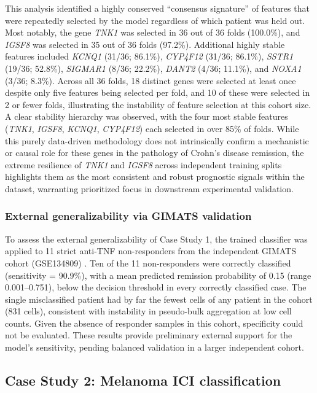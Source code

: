 \documentclass{bmcart}
\begin{document}
This analysis identified a highly conserved ``consensus signature'' of features that were repeatedly selected by the model regardless of which patient was held out. Most notably, the gene \textit{TNK1} was selected in 36 out of 36 folds (100.0\%), and \textit{IGSF8} was selected in 35 out of 36 folds (97.2\%). Additional highly stable features included \textit{KCNQ1} (31/36; 86.1\%), \textit{CYP4F12} (31/36; 86.1\%), \textit{SSTR1} (19/36; 52.8\%), \textit{SIGMAR1} (8/36; 22.2\%), \textit{DANT2} (4/36; 11.1\%), and \textit{NOXA1} (3/36; 8.3\%). Across all 36 folds, 18 distinct genes were selected at least once despite only five features being selected per fold, and 10 of these were selected in 2 or fewer folds, illustrating the instability of feature selection at this cohort size. A clear stability hierarchy was observed, with the four most stable features (\textit{TNK1}, \textit{IGSF8}, \textit{KCNQ1}, \textit{CYP4F12}) each selected in over 85\% of folds. While this purely data-driven methodology does not intrinsically confirm a mechanistic or causal role for these genes in the pathology of Crohn's disease remission, the extreme resilience of \textit{TNK1} and \textit{IGSF8} across independent training splits highlights them as the most consistent and robust prognostic signals within the dataset, warranting prioritized focus in downstream experimental validation.

\subsubsection*{External generalizability via GIMATS validation}
To assess the external generalizability of Case Study 1, the trained classifier was applied to 11 strict anti-TNF non-responders from the independent GIMATS cohort (GSE134809) \cite{martin}. Ten of the 11 non-responders were correctly classified (sensitivity = 90.9\%), with a mean predicted remission probability of 0.15 (range 0.001--0.751), below the decision threshold in every correctly classified case. The single misclassified patient had by far the fewest cells of any patient in the cohort (831 cells), consistent with instability in pseudo-bulk aggregation at low cell counts. Given the absence of responder samples in this cohort, specificity could not be evaluated. These results provide preliminary external support for the model's sensitivity, pending balanced validation in a larger independent cohort.

\subsection*{Case Study 2: Melanoma ICI classification}
\end{document}
